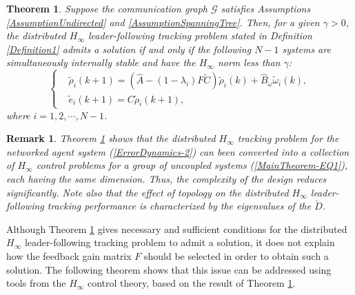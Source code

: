 \documentclass[a4paper,10pt,onecolumn]{article}
\newtheorem{remark}{Remark}
\newtheorem{theorem}{Theorem}
\begin{document}
\begin{theorem}\label{MainTheorem1}
Suppose the communication
graph $\mathcal{G}$ satisfies Assumptions \ref{AssumptionUndirected} and  \ref{AssumptionSpanningTree}.
Then, for a given $\gamma>0$, the distributed $H_{\infty}$ leader-following
tracking problem stated in Definition \ref{Definition1} admits a solution
if and only if the following
$N-1$ systems are simultaneously internally stable and have the
$H_{\infty}$ norm less than $\gamma$:
\begin{equation} \label{MainTheorem-EQ1}
\left\{\begin{aligned}
       &\tilde{\rho}_{i}(k+1)=(\hat{A}-(1-\lambda_{i})F\tilde{C})\tilde{\rho}_{i}(k)+
 \hat{B}_{\omega}\tilde{\omega}_{i}(k), \\
 &\tilde{e}_{i}(k+1)=C\tilde{\rho}_{i}(k+1),
                          \end{aligned} \right.
                          \end{equation}
 where $i=1,2,\cdots,N-1$.
\end{theorem}

\begin{remark}\label{RemarkBelowTheorem1}
Theorem \ref{MainTheorem1} shows that the distributed $H_{\infty}$ tracking
problem for the networked agent system (\ref{ErrorDynamics-2}) can been
converted into a collection of $H_{\infty}$ control problems for a group of
uncoupled systems
(\ref{MainTheorem-EQ1}), each having the same dimension. Thus, the
complexity of the design reduces significantly. Note also that the effect
of topology on the distributed $H_{\infty}$ leader-following tracking
performance is characterized by the eigenvalues of the $\breve{D}$.
\end{remark}

Although Theorem \ref{MainTheorem1} gives necessary and sufficient
conditions for the distributed $H_{\infty}$ leader-following tracking
problem to admit a solution, it does not explain how the feedback gain
matrix $F$ should be selected in order to obtain such a solution. The
following theorem shows that this issue can be addressed using
tools from the $H_{\infty}$ control theory, based on the result of Theorem
\ref{MainTheorem1}.
\end{document}

